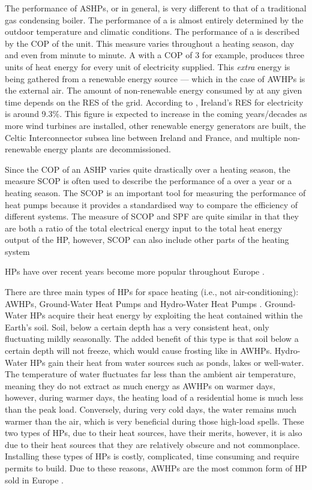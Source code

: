 The performance of \acp{ASHP}, or \HPs in general, is very different to that of a traditional gas condensing boiler. The performance of a \HP is almost entirely determined by the outdoor temperature and climatic conditions. The performance of a \HP is described by the \ac{COP} of the unit. This measure varies throughout a heating season, day and even from minute to minute. A \HP with a \ac{COP} of 3 for example, produces three units of heat energy for every unit of electricity supplied. This \textit{extra} energy is being gathered from a renewable energy source --- which in the case of \acp{AWHP} is the external air. The amount of non-renewable energy consumed by \HP at any given time depends on the \ac{RES} of the grid. According to \citeauthor{seai_2020}, Ireland's \ac{RES} for electricity is around 9.3\%. This figure is expected to increase in the coming years/decades as more wind turbines are installed, other renewable energy generators are built, the Celtic Interconnector subsea line between Ireland and France, and multiple non-renewable energy plants are decommissioned.

Since the \ac{COP} of an \ac{ASHP} varies quite drastically over a heating season, the measure \ac{SCOP} is often used to describe the performance of a \HP over a year or a heating season. The  \ac{SCOP} is an important tool for measuring the performance of heat pumps because it provides a standardised way to compare the efficiency of different systems. The measure of \ac{SCOP} and \ac{SPF} are quite similar in that they are both a ratio of the total electrical energy input to the total heat energy output of the \ac{HP}, however, \ac{SCOP} can also include other parts of the heating system 




\acp{HP} have over recent years become more popular throughout Europe \cite{ehpa_2015,nowak_2018}. 

There are three main types of \acp{HP} for space heating (i.e., not air-conditioning): \acp{AWHP}, Ground-Water Heat Pumps and Hydro-Water Heat Pumps \cite{omer_2008,Ochsner_2007}. Ground-Water \acp{HP} acquire their heat energy by exploiting the heat contained within the Earth's soil. Soil, below a certain depth has a very consistent heat, only fluctuating mildly seasonally. The added benefit of this type is that soil below a certain depth will not freeze, which would cause frosting like in \acp{AWHP}. Hydro-Water \acp{HP} gain their heat from water sources such as ponds, lakes or well-water. The temperature of water fluctuates far less than the ambient air temperature, meaning they do not extract as much energy as \acp{AWHP} on warmer days, however, during warmer days, the heating load of a residential home is much less than the peak load. Conversely, during very cold days, the water remains much warmer than the air, which is very beneficial during those high-load spells. These two types of \acp{HP}, due to their heat sources, have their merits, however, it is also due to their heat sources that they are relatively obscure and not commonplace. Installing these types of \acp{HP} is costly, complicated, time consuming and require permits to build. Due to these reasons, \acp{AWHP} are the most common form of \ac{HP} sold in Europe \cite{ehpa_2015}.  

